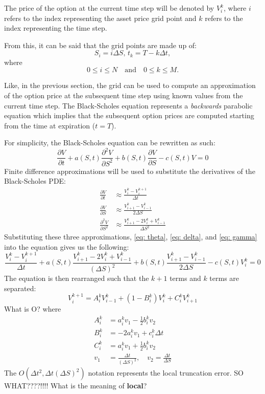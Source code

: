 The price of the option at the current time step will be denoted by $V_i^k$, where $i$ refers to the index representing the asset price grid point  
and $k$ refers to the index representing the time step.

From this, it can be said that the grid points are made up of:
\[
S_i = i {\Delta S},\, t_k = T - k {\Delta t},
\]
where
\[
0 \leq i \leq N \quad \text{and} \quad 0 \leq k \leq M.
\]

Like, in the previous section, the grid can be used to compute an approximation of the option price at the subsequent time step using known values from the current time step. The Black-Scholes equation represents a \textit{backwards} parabolic equation which implies that the subsequent option prices are computed starting from the time at expiration ($t = T$). 

For simplicity, the Black-Scholes equation can be rewritten as such:
\[
\frac{\partial V}{\partial t} + a(S,t) \frac{\partial^2 V}{\partial S^2} + b(S,t) \frac{\partial V}{\partial S} - c(S,t) V = 0
\]
Finite difference approximations will be used to substitute the derivatives of the Black-Scholes PDE:
\begin{align}
\frac{\partial V}{\partial t} &\approx \frac{V_i^k - V_i^{k+1}}{\Delta t} \tag{Theta} \label{eq: theta} \\
\frac{\partial V}{\partial S} &\approx \frac{V_{i+1}^k - V_{i-1}^k}{2 \Delta S} \tag{Delta} \label{eq: delta}\\
\frac{\partial^2 V}{\partial S^2} &\approx \frac{V_{i+1}^k - 2V_i^k + V_{i-1}^k}{\Delta S^2} \tag{Gamma}\label{eq: gamma}
\end{align}
Substituting these three approximations, \eqref{eq: theta}, \eqref{eq: delta}, and \eqref{eq: gamma} into the equation gives us the following:
\[
\frac{V_i^k - V_i^{k+1}}{\Delta t} + a(S,t) \frac{V_{i+1}^k - 2V_i^k + V_{i-1}^k}{(\Delta S)^2} + b(S,t) \frac{V_{i+1}^k - V_{i-1}^k}{2 \Delta S} - c(S,t) V_i^k = 0
\]
The equation is then rearranged such that the $k+1$ terms and $k$ terms are separated:
\[
V_i^{k+1} = A_i^k V_{i-1}^k + (1-B_i^k) V_i^k + C_i^k V_{i+1}^k
\]
{\color{red}What is O?}
where
\begin{align*}
    A_i^k &= a_i^k v_1 - \frac{1}{2} b_i^k v_2 \\
    B_i^k &= -2a_i^k v_1 + c_i^k \Delta t \\
    C_i^k &= a_i^k v_1 + \frac{1}{2} b_i^k v_2 \\
    v_1 &= \frac{\Delta t}{(\Delta S)^2}, \quad v_2 = \frac{\Delta t}{\Delta S}
\end{align*}
The $O(\Delta t^2, \Delta t (\Delta S)^2)$ notation represents the local truncation error.
{\color{red}SO WHAT????!!!! What is the meaning of \textbf{local}?}

